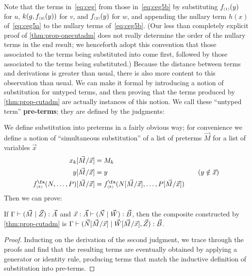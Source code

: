 \begin{props}
Note that the terms in~\eqref{eq:ceg} from those in~\eqref{eq:ceg5b} by substituting $f_{\scriptscriptstyle(1)}(y)$ for $u$, $k(g,f_{\scriptscriptstyle(3)}(y))$ for $v$, and $f_{\scriptscriptstyle(2)}(y)$ for $w$, and appending the nullary term $h(x)$ of~\eqref{eq:ceg5a} to the nullary terms of~\eqref{eq:ceg5b}.
(Our less than completely explicit proof of \cref{thm:prop-onecutadm} does not really determine the order of the nullary terms in the end result; we henceforth adopt this convention that those associated to the terms being substituted into come first, followed by those associated to the terms being substituted.)
Because the distance between terms and derivations is greater than usual, there is also more content to this observation than usual.
We can make it formal by introducing a notion of substitution for untyped terms, and then proving that the terms produced by \cref{thm:prop-cutadm} are actually instances of this notion.
We call these ``untyped term'' \textbf{pre-terms}; they are defined by the judgments:
We define substitution into preterms in a fairly obvious way; for convenience we define a notion of ``simultaneous substitution'' of a list of preterms $\vec M$ for a list of variables $\vec x$
\begin{alignat*}{2}
  x_k[\vec M/\vec x] &= M_k\\
  y[\vec M/\vec x] &= y &\quad (y\notin \vec x)\\
  f^\fa\s k(N,\dots,P)[\vec M/\vec x] &= f^\fa\s k(N[\vec M/\vec x],\dots,P[\vec M/\vec x])
\end{alignat*}
Then we can prove:

\begin{lem}\label{thm:prop-cutissub}
  If $\Gamma \vdash (\vec M\mid \vec Z):\vec A$ and $\vec x:\vec A \vdash (\vec N\mid \vec W):\vec B$, then the composite constructed by \cref{thm:prop-cutadm} is $\Gamma \vdash (\vec N[\vec M/\vec x]\mid \vec W[\vec M/\vec x],\vec Z):\vec B$.
\end{lem}
\begin{proof}
  Inducting on the derivation of the second judgment, we trace through the proofs and find that the resulting terms are eventually obtained by applying a generator or identity rule, producing terms that match the inductive definition of substitution into pre-terms.
\end{proof}


\end{props}
